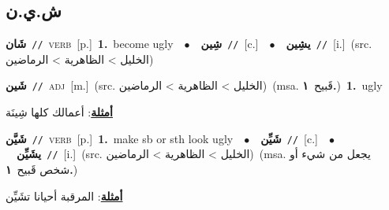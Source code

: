 \documentclass[10pt,a4paper,twoside]{article} %
\begin{document}
\begin{multicols}{2}
\vspace{-3mm}
\subsection*{\color{blue}\foreignlanguage{arabic}{ش.ي.ن}\color{blue}{}} 

{\setlength\topsep{0pt}\textbf{\foreignlanguage{arabic}{شَان}}\ {\color{gray}\texttt{//}\color{black}}\ \textsc{verb}\ [p.]\ \textbf{1.}~become ugly\ \ $\bullet$\ \ \setlength\topsep{0pt}\textbf{\foreignlanguage{arabic}{شِين}}\ {\color{gray}\texttt{//}\color{black}}\ [c.]\ \ $\bullet$\ \ \setlength\topsep{0pt}\textbf{\foreignlanguage{arabic}{يشِين}}\ {\color{gray}\texttt{//}\color{black}}\ [i.]\ (src. \color{gray}\foreignlanguage{arabic}{الخليل > الظاهرية > الرماضين}\color{black})\ } \vspace{2mm}

{\setlength\topsep{0pt}\textbf{\foreignlanguage{arabic}{شَين}}\ {\color{gray}\texttt{//}\color{black}}\ \textsc{adj}\ [m.]\ (src. \color{gray}\foreignlanguage{arabic}{الخليل > الظاهرية > الرماضين}\color{black})\ \color{gray}(msa. \foreignlanguage{arabic}{قَبيح}~\foreignlanguage{arabic}{\textbf{١.}})\color{black}\ \textbf{1.}~ugly\  \begin{flushright}\color{gray}\foreignlanguage{arabic}{\textbf{\underline{\foreignlanguage{arabic}{أمثلة}}}: أعمالك كلها شِينَة}\end{flushright}\color{black}} \vspace{2mm}

{\setlength\topsep{0pt}\textbf{\foreignlanguage{arabic}{شَيَّن}}\ {\color{gray}\texttt{//}\color{black}}\ \textsc{verb}\ [p.]\ \textbf{1.}~make sb or sth look ugly\ \ $\bullet$\ \ \setlength\topsep{0pt}\textbf{\foreignlanguage{arabic}{شَيِّن}}\ {\color{gray}\texttt{//}\color{black}}\ [c.]\ \ $\bullet$\ \ \setlength\topsep{0pt}\textbf{\foreignlanguage{arabic}{يشَيِّن}}\ {\color{gray}\texttt{//}\color{black}}\ [i.]\ (src. \color{gray}\foreignlanguage{arabic}{الخليل > الظاهرية > الرماضين}\color{black})\ \color{gray}(msa. \foreignlanguage{arabic}{يجعل من شيء أو شخص قَبيح}~\foreignlanguage{arabic}{\textbf{١.}})\color{black}\  \begin{flushright}\color{gray}\foreignlanguage{arabic}{\textbf{\underline{\foreignlanguage{arabic}{أمثلة}}}: المرقبة أحيانا تشَيِّن}\end{flushright}\color{black}} \vspace{2mm}


\end{multicols}
\end{document}
